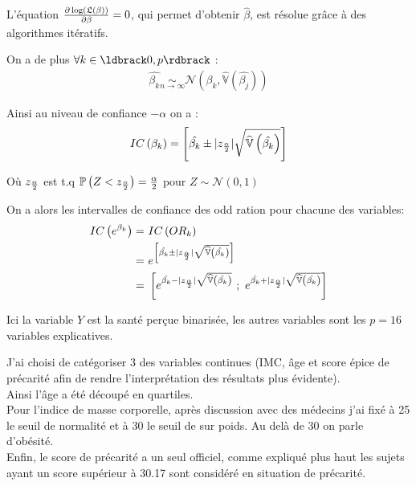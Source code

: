 \documentclass{book}
\begin{document}
\bigskip

\noindent
L'équation $ {{\partial  \log \left( \mathfrak{L}(\beta) \right)} \over {\partial \beta} } = 0  $, qui permet d'obtenir $\hat{\beta}$, est résolue grâce à des algorithmes itératifs.\\

\bigskip

\noindent
On a de plus $\forall k \in \ldbrack 0,p \rdbrack$ :
\begin{align*}
\hat{\beta_k} \underset{n \rightarrow \infty}{\sim} \mathcal{N} \left( \beta_k,\widehat{\mathbb{V}} \left(  \hat{\beta_j}\right) \right)
\end{align*}

\bigskip

\noindent
Ainsi au niveau de confiance $-\alpha$ on a :
\begin{align*}
IC \left( \beta_k \right) =
 \left[
  \hat{\beta_k} \pm |z_{{\alpha} \over {2}}| \sqrt{\widehat{\mathbb{V}}\left( \hat{\beta_k} \right)}
\right]\\
\end{align*}

\noindent
Où $ z_{ {\alpha} \over {2}} $ est t.q $ \mathbb{P}\left( Z <  z_{ {\alpha} \over {2}} \right) = {{\alpha} \over {2}}$ pour $ Z \sim \mathcal{N}(0,1) $

\bigskip

\noindent
On a alors les intervalles de confiance des odd ration pour chacune des variables:\\
\begin{align*}
IC \left( e^{\beta_k} \right)  =& ~ IC \left( OR_k \right) \\
= & ~ e^{\left[ \hat{\beta_k} \pm |z_{{\alpha} \over {2}}| \sqrt{\widehat{\mathbb{V}}\left( \hat{\beta_k} \right)} \right]} \\
= & ~
 \left[
e^{\hat{\beta_k} - |z_{{\alpha} \over {2}}| \sqrt{\widehat{\mathbb{V}}\left( \hat{\beta_k} \right)}} 
~;~ 
e^{\hat{\beta_k} + |z_{{\alpha} \over {2}}| \sqrt{\widehat{\mathbb{V}}\left( \hat{\beta_k} \right)}} 
\right]
\end{align*}

\bigskip
\noindent
Ici la variable $Y$ est la santé perçue binarisée, les autres variables sont les $p = 16 $ variables explicatives.

\bigskip

\noindent
J'ai choisi de catégoriser 3 des variables continues (IMC, âge et score épice de précarité afin de rendre l'interprétation des résultats plus évidente).\\
Ainsi l'âge a été découpé en quartiles.\\
Pour l'indice de masse corporelle, après discussion avec des médecins j'ai fixé à 25 le seuil de normalité et à 30 le seuil de sur poids. Au delà de 30 on parle d'obésité.\\
Enfin, le score de précarité a un seul officiel, comme expliqué plus haut les sujets ayant un score supérieur à 30.17 sont considéré en situation de précarité.\\
\end{document}
